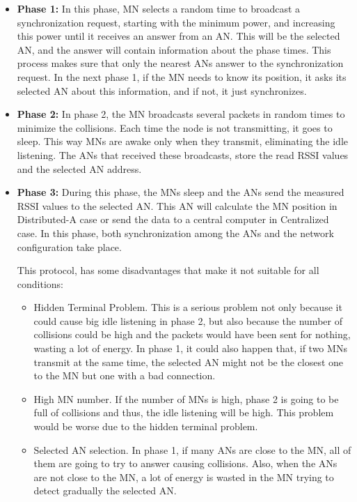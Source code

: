 \begin{itemize}
 \item \textbf{Phase 1:} In this phase, \ac{MN} selects a random time to broadcast a synchronization request, starting with the minimum power,
and increasing this power until it receives an answer from an \ac{AN}. This will be the selected \ac{AN}, and the answer will contain information
about the phase times. This process makes sure that only the nearest \acp{AN} answer to the synchronization request. In the next phase 1, if 
the \ac{MN} needs to know its position, it asks its selected \ac{AN} about this information, and if not, it just synchronizes.
 \item \textbf{Phase 2:} In phase 2, the \ac{MN} broadcasts several packets in random times to minimize the collisions. Each time the node is not
transmitting, it goes to sleep. This way \acp{MN} are awake only when they transmit, eliminating the idle listening. The \acp{AN} that
received these broadcasts, store the read \ac{RSSI} values and the selected \ac{AN} address.
 \item \textbf{Phase 3:} During this phase, the \acp{MN} sleep and the \acp{AN} send the measured \ac{RSSI} values to the selected \ac{AN}. 
This \ac{AN} will calculate the \ac{MN} position in Distributed-A case or send the data to a central computer in Centralized case. In this phase, both 
synchronization among the \acp{AN} and the network configuration take place.

This protocol, has some disadvantages that make it not suitable for all conditions:

\begin{itemize}
 \item Hidden Terminal Problem. This is a serious problem not only because it could cause big idle listening in phase 2, but also because the number
of collisions could be high and the packets would have been sent for nothing, wasting a lot of energy. In phase 1, it could also 
happen that, if two \acp{MN} transmit at the same time, the selected \ac{AN} might not be the closest one to the \ac{MN} but one with a bad connection.
 \item High \ac{MN} number. If the number of \acp{MN} is high, phase 2 is going to be full of collisions and thus, the idle listening will be
high. This problem would be worse due to the hidden terminal problem.
 \item Selected \ac{AN} selection. In phase 1, if many \acp{AN} are close to the \ac{MN}, all of them are going to try to answer causing collisions. Also, 
when the \acp{AN} are not close to the \ac{MN}, a lot of energy is wasted in the \ac{MN} trying to detect gradually the selected \ac{AN}.
\end{itemize}


\end{itemize}


